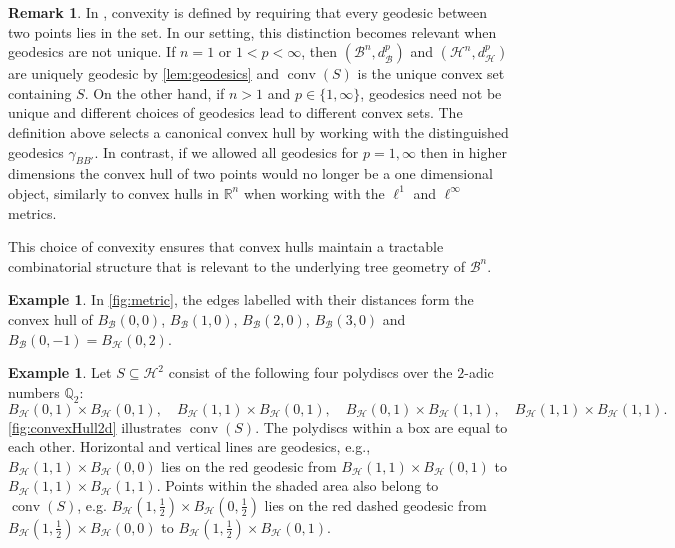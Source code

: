 \documentclass[10pt]{article}
\theoremstyle{definition}
\newtheorem{remark}[theorem]{Remark}
\newtheorem{example}[theorem]{Example}
\newcommand{\QQ}{\mathbb{Q}}
\DeclareMathOperator{\conv}{conv}
\begin{document}
\begin{remark}
  \label{rem:convexity}
  In \cite[Definition 3.6.5]{BuragoBuragoIvanov2001}, convexity is defined by requiring that every geodesic between two points lies in the set. In our setting, this distinction becomes relevant when geodesics are not unique. If $n=1$ or $1<p<\infty$, then $(\mathcal{B}^n, d_{\mathcal{B}}^p)$ and $(\mathcal{H}^n, d_{\mathcal{H}}^p)$ are uniquely geodesic by \cref{lem:geodesics} and $\conv(S)$ is the unique convex set containing $S$. On the other hand, if $n>1$ and $p\in \{1,\infty\}$, geodesics need not be unique and different choices of geodesics lead to different convex sets. The definition above selects a canonical convex hull by working with the distinguished geodesics $\gamma_{BB'}$. In contrast, if we allowed all geodesics for $p = 1, \infty$ then in higher dimensions the convex hull of two points would no longer be a one dimensional object, similarly to convex hulls in $\mathbb R ^ n$ when working with the $\ell^1$ and $\ell^\infty$ metrics.
\end{remark}

This choice of convexity ensures that convex hulls maintain a tractable combinatorial structure that is relevant to the underlying tree geometry of $\mathcal{B}^n$.

\begin{example}
  \label{ex:convexHull1d}
  In \cref{fig:metric}, the edges labelled with their distances form the convex hull of $B_{\mathcal{B}}(0,0)$, $B_{\mathcal{B}}(1,0)$, $B_{\mathcal{B}}(2,0)$, $B_{\mathcal{B}}(3,0)$ and $B_{\mathcal{B}}(0,-1)=B_{\mathcal{H}}(0,2)$.
\end{example}

\begin{example}
  \label{ex:convexHull2d}
  Let $S\subseteq\mathcal H^2$ consist of the following four polydiscs over the $2$-adic numbers $\QQ_2$:
  \begin{equation*}
    B_\mathcal{H}(0,1)\times B_\mathcal{H}(0,1),\quad
    B_\mathcal{H}(1,1)\times B_\mathcal{H}(0,1),\quad
    B_\mathcal{H}(0,1)\times B_\mathcal{H}(1,1),\quad
    B_\mathcal{H}(1,1)\times B_\mathcal{H}(1,1).
  \end{equation*}
  \cref{fig:convexHull2d} illustrates $\conv(S)$. The polydiscs within a box are equal to each other.  Horizontal and vertical lines are geodesics, e.g., $B_\mathcal{H}(1,1)\times B_\mathcal{H}(0,0)$ lies on the red geodesic from $B_\mathcal{H}(1,1)\times B_\mathcal{H}(0,1)$ to $B_\mathcal{H}(1,1)\times B_\mathcal{H}(1,1)$.  Points within the shaded area also belong to $\conv(S)$, e.g. $B_\mathcal{H}(1,\frac12)\!\times\! B_\mathcal{H}(0,\frac12)$ lies on the red dashed geodesic from $B_\mathcal{H}(1,\frac12)\!\times\! B_\mathcal{H}(0,0)$ to $B_\mathcal{H}(1,\frac12)\!\times\! B_\mathcal{H}(0,1)$.
\end{example}
\end{document}

